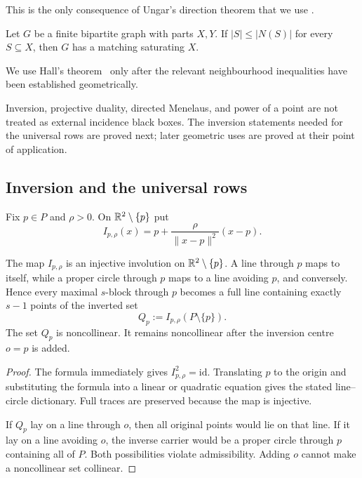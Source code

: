 This is the only consequence of Ungar's direction theorem that we use
\cite{Ungar1982}.

\begin{theorem}[Hall]\label{thm:hall}
Let $G$ be a finite bipartite graph with parts $X,Y$.  If
$|S|\leq|N(S)|$ for every $S\subseteq X$, then $G$ has a matching saturating
$X$.
\end{theorem}

We use Hall's theorem~\cite{Hall1935} only after the relevant neighbourhood
inequalities have been established geometrically.

Inversion, projective duality, directed Menelaus, and power of a point are
not treated as external incidence black boxes.  The inversion statements
needed for the universal rows are proved next; later geometric uses are
proved at their point of application.

\subsection{Inversion and the universal rows}

Fix $p\in P$ and $\rho>0$.  On $\mathbb{R}^2\setminus\{p\}$ put
\[
 I_{p,\rho}(x)=p+\frac{\rho}{\|x-p\|^2}(x-p).
\]

\begin{lemma}\label{lem:inversion-dictionary}
The map $I_{p,\rho}$ is an injective involution on
$\mathbb{R}^2\setminus\{p\}$.  A line through $p$ maps to itself, while a proper
circle through $p$ maps to a line avoiding $p$, and conversely.  Hence every
maximal $s$-block through $p$ becomes a full line containing exactly $s-1$
points of the inverted set
\[
 Q_p:=I_{p,\rho}(P\setminus\{p\}).
\]
The set $Q_p$ is noncollinear.  It remains noncollinear after the inversion
centre $o=p$ is added.
\end{lemma}

\begin{proof}
The formula immediately gives $I_{p,\rho}^2=\mathrm{id}$.  Translating
$p$ to the origin and substituting the formula into a linear or quadratic
equation gives the stated line--circle dictionary.  Full traces are
preserved because the map is injective.

If $Q_p$ lay on a line through $o$, then all original points would lie on
that line.  If it lay on a line avoiding $o$, the inverse carrier would be a
proper circle through $p$ containing all of $P$.  Both possibilities violate
admissibility.  Adding $o$ cannot make a noncollinear set collinear.
\end{proof}

